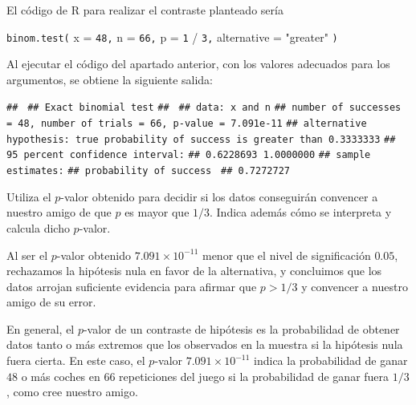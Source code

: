 \documentclass[
  notoc,
  nobib,
  degree=inf]{mnye}
\newenvironment{Shaded}{\begin{snugshade}}{\end{snugshade}}
\newcommand{\AttributeTok}[1]{\textcolor[rgb]{0.77,0.63,0.00}{#1}}
\newcommand{\DecValTok}[1]{\textcolor[rgb]{0.00,0.00,0.81}{#1}}
\newcommand{\FunctionTok}[1]{\textcolor[rgb]{0.00,0.00,0.00}{#1}}
\newcommand{\NormalTok}[1]{#1}
\newcommand{\SpecialCharTok}[1]{\textcolor[rgb]{0.00,0.00,0.00}{#1}}
\newcommand{\StringTok}[1]{\textcolor[rgb]{0.31,0.60,0.02}{#1}}
\renewcommand{\DecValTok}[1]{\textcolor[RGB]{64, 160, 112}{\texttt{#1}}}
\renewcommand{\FunctionTok}[1]{\textcolor[rgb]{0.13,0.29,0.53}{\texttt{#1}}}
\renewcommand{\NormalTok}[1]{\texttt{#1}}
\begin{document}
\begin{ex}
\begin{parts}
\begin{sol}
El código de \textsf{R} para realizar el contraste planteado sería

\begin{Shaded}
\begin{Highlighting}[]
\FunctionTok{binom.test}\NormalTok{(}
  \AttributeTok{x =} \DecValTok{48}\NormalTok{,}
  \AttributeTok{n =} \DecValTok{66}\NormalTok{,}
  \AttributeTok{p =} \DecValTok{1} \SpecialCharTok{/} \DecValTok{3}\NormalTok{,}
  \AttributeTok{alternative =} \StringTok{"greater"}
\NormalTok{)}
\end{Highlighting}
\end{Shaded}

\end{sol}

\item

Al ejecutar el código del apartado anterior, con los valores adecuados para los argumentos, se obtiene la siguiente salida:

\begin{Shaded}
\begin{Highlighting}[]
\NormalTok{\#\# }
\NormalTok{\#\#  Exact binomial test}
\NormalTok{\#\# }
\NormalTok{\#\# data:  x and n}
\NormalTok{\#\# number of successes = 48, number of trials = 66, p{-}value = 7.091e{-}11}
\NormalTok{\#\# alternative hypothesis: true probability of success is greater than 0.3333333}
\NormalTok{\#\# 95 percent confidence interval:}
\NormalTok{\#\#  0.6228693 1.0000000}
\NormalTok{\#\# sample estimates:}
\NormalTok{\#\# probability of success }
\NormalTok{\#\#              0.7272727}
\end{Highlighting}
\end{Shaded}

Utiliza el \(p\)-valor obtenido para decidir si los datos conseguirán convencer a nuestro amigo de que \(p\) es mayor que \(1/3\). Indica además cómo se interpreta y calcula dicho \(p\)-valor.

\begin{sol}
Al ser el \(p\)-valor obtenido \(\ensuremath{7.091\times 10^{-11}}\) menor que el nivel de significación \(0.05\), rechazamos la hipótesis nula en favor de la alternativa, y concluimos que los datos arrojan suficiente evidencia para afirmar que \(p>1/3\) y convencer a nuestro amigo de su error.

En general, el \(p\)-valor de un contraste de hipótesis es la probabilidad de obtener datos tanto o más extremos que los observados en la muestra si la hipótesis nula fuera cierta.
En este caso, el \(p\)-valor \(\ensuremath{7.091\times 10^{-11}}\) indica la probabilidad de ganar \(48\) o más coches en \(66\) repeticiones del juego si la probabilidad de ganar fuera \(1/3\), como cree nuestro amigo.


\end{sol}
\end{parts}
\end{ex}
\end{document}
